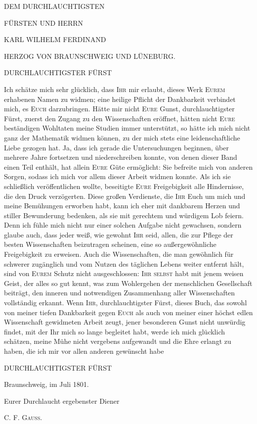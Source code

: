 \begin{center}
\textsc{DEM DURCHLAUCHTIGSTEN}

\smallskip

\textsc{FÜRSTEN UND HERRN}

\smallskip

{\Large\textsc{KARL WILHELM FERDINAND}}

\smallskip

\textsc{HERZOG VON BRAUNSCHWEIG UND LÜNEBURG.}

\smallskip


\smallskip

\textsc{DURCHLAUCHTIGSTER FÜRST}
\end{center}

\noindent Ich schätze mich sehr glücklich, dass \textsc{Ihr} mir erlaubt, dieses Werk \textsc{Eurem} erhabenen Namen zu widmen; eine heilige Pflicht der Dankbarkeit verbindet mich, es \textsc{Euch} darzubringen. Hätte mir nicht \textsc{Eure} Gunst, durchlauchtigster Fürst, zuerst den Zugang zu den Wissenschaften eröffnet, hätten nicht \textsc{Eure} beständigen Wohltaten meine Studien immer unterstützt, so hätte ich mich nicht ganz der Mathematik widmen können, zu der mich stets eine leidenschaftliche Liebe gezogen hat. Ja, dass ich gerade die Untersuchungen beginnen, über mehrere Jahre fortsetzen und niederschreiben konnte, von denen dieser Band einen Teil enthält, hat allein \textsc{Eure} Güte ermöglicht: Sie befreite mich von anderen Sorgen, sodass ich mich vor allem dieser Arbeit widmen konnte. Als ich sie schließlich veröffentlichen wollte, beseitigte \textsc{Eure} Freigebigkeit alle Hindernisse, die den Druck verzögerten. Diese großen Verdienste, die \textsc{Ihr} Euch um mich und meine Bemühungen erworben habt, kann ich eher mit dankbarem Herzen und stiller Bewunderung bedenken, als sie mit gerechtem und würdigem Lob feiern. Denn ich fühle mich nicht nur einer solchen Aufgabe nicht gewachsen, sondern glaube auch, dass jeder weiß, wie gewohnt \textsc{Ihr} seid, allen, die zur Pflege der besten Wissenschaften beizutragen scheinen, eine so außergewöhnliche Freigebigkeit zu erweisen. Auch die Wissenschaften, die man gewöhnlich für schwerer zugänglich und vom Nutzen des täglichen Lebens weiter entfernt hält, sind von \textsc{Eurem} Schutz nicht ausgeschlossen: \textsc{Ihr selbst} habt mit jenem weisen Geist, der alles so gut kennt, was zum Wohlergehen der menschlichen Gesellschaft beiträgt, den inneren und notwendigen Zusammenhang aller Wissenschaften vollständig erkannt. Wenn \textsc{Ihr}, durchlauchtigster Fürst, dieses Buch, das sowohl von meiner tiefen Dankbarkeit gegen \textsc{Euch} als auch von meiner einer höchst edlen Wissenschaft gewidmeten Arbeit zeugt, jener besonderen Gunst nicht unwürdig findet, mit der Ihr mich so lange begleitet habt, werde ich mich glücklich schätzen, meine Mühe nicht vergebens aufgewandt und die Ehre erlangt zu haben, die ich mir vor allen anderen gewünscht habe

\begin{center}
\textsc{DURCHLAUCHTIGSTER FÜRST}
\end{center}

\noindent\hspace*{1.5em}Braunschweig, im Juli 1801.

\smallskip
\begin{flushright}
Eurer Durchlaucht ergebenster Diener

\smallskip
\textsc{C. F. Gauss.}
\end{flushright}
